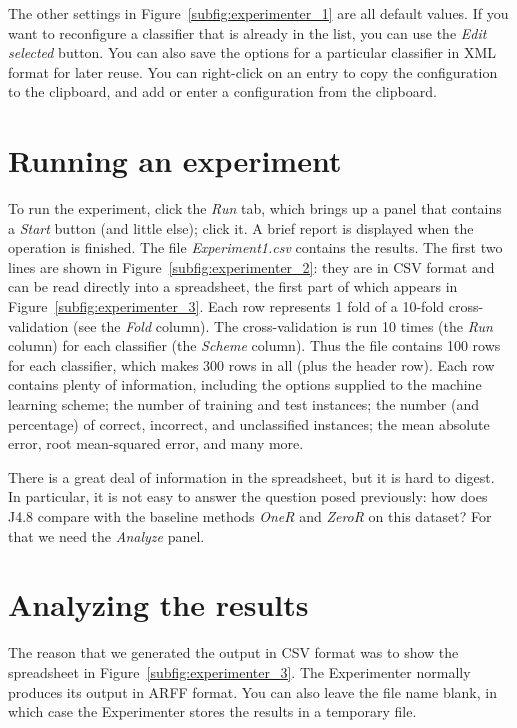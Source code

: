 The other settings in Figure~\ref{subfig:experimenter_1} are all
default values. If you want to reconﬁgure a classiﬁer that is already
in the list, you can use the \textit{Edit selected} button. You can
also save the options for a particular classiﬁer in XML format for
later reuse. You can right-click on an entry to copy the configuration
to the clipboard, and add or enter a configuration from the clipboard.

\section{Running an experiment}

To run the experiment, click the \textit{Run} tab, which brings up a
panel that contains a \textit{Start} button (and little else); click
it. A brief report is displayed when the operation is finished. The
file \textit{Experiment1.csv} contains the results. The first two
lines are shown in Figure~\ref{subfig:experimenter_2}: they are in CSV
format and can be read directly into a spreadsheet, the first part of
which appears in Figure~\ref{subfig:experimenter_3}. Each row
represents 1 fold of a 10-fold cross-validation (see the \textit{Fold}
column). The cross-validation is run 10 times (the \textit{Run}
column) for each classifier (the \textit{Scheme} column). Thus the
file contains 100 rows for each classifier, which makes 300 rows in
all (plus the header row). Each row contains plenty of information,
including the options supplied to the machine learning scheme; the
number of training and test instances; the number (and percentage) of
correct, incorrect, and unclassified instances; the mean absolute
error, root mean-squared error, and many more.

There is a great deal of information in the spreadsheet, but it is
hard to digest. In particular, it is not easy to answer the question
posed previously: how does J4.8 compare with the baseline methods
\textit{OneR} and \textit{ZeroR} on this dataset? For that we need the
\textit{Analyze} panel.

\section{Analyzing the results}

The reason that we generated the output in CSV format was to show the
spreadsheet in Figure~\ref{subfig:experimenter_3}. The Experimenter
normally produces its output in ARFF format. You can also leave the
file name blank, in which case the Experimenter stores the results in
a temporary file.

